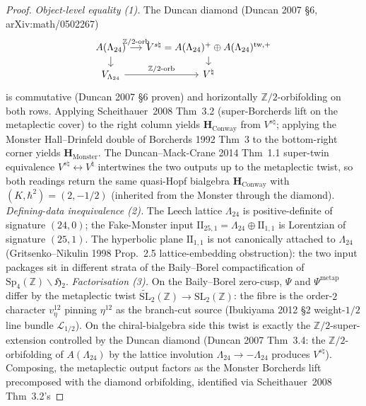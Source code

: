 \begin{proof}[Proof]
\emph{Object-level equality (1).}
The Duncan diamond (Duncan 2007 \S6, arXiv:math/0502267)
\[
 \begin{tikzcd}[column sep=small, row sep=small]
 A(\Lambda_{24}) \arrow[r, "\mathbb{Z}/2\text{-}\mathrm{orb}"]
 \arrow[d]
 & V^{s\natural} = A(\Lambda_{24})^{+}\oplus A(\Lambda_{24})^{\mathrm{tw},+}
 \arrow[d] \\
 V_{\Lambda_{24}} \arrow[r, "\mathbb{Z}/2\text{-}\mathrm{orb}"]
 & V^\natural
 \end{tikzcd}
\]
is commutative (Duncan 2007 \S6 proven) and horizontally
$\mathbb{Z}/2$-orbifolding on both rows. Applying
Scheithauer~2008 Thm~3.2 (super-Borcherds lift on the metaplectic
cover) to the right column yields
$\mathbf{H}_{\mathrm{Conway}}$ from $V^{s\natural}$;
applying the Monster Hall--Drinfeld double of Borcherds 1992 Thm~3
to the bottom-right corner yields $\mathbf{H}_{\mathrm{Monster}}$.
The Duncan--Mack-Crane 2014 Thm~1.1 super-twin equivalence
$V^{s\natural}\leftrightarrow V^\natural$ intertwines the two outputs
up to the metaplectic twist, so both readings return the same
quasi-Hopf bialgebra $\mathbf{H}_{\mathrm{Conway}}$ with
$(K,\hbar^2) = (2,-1/2)$ (inherited from the Monster through the
diamond).
\emph{Defining-data inequivalence (2).}
The Leech lattice $\Lambda_{24}$ is positive-definite of
signature $(24,0)$; the Fake-Monster input
$\mathrm{II}_{25,1} = \Lambda_{24}\oplus\mathrm{II}_{1,1}$ is
Lorentzian of signature $(25,1)$. The hyperbolic plane
$\mathrm{II}_{1,1}$ is not canonically attached to $\Lambda_{24}$
(Gritsenko--Nikulin 1998 Prop.~2.5 lattice-embedding
obstruction): the two input packages sit in different strata
of the Baily--Borel compactification of $\mathrm{Sp}_4(\mathbb{Z})\backslash\mathfrak{H}_2$.
\emph{Factorisation (3).}
On the Baily--Borel zero-cusp, $\Psi$ and $\Psi^{\mathrm{metap}}$
differ by the metaplectic twist $\widetilde{\mathrm{SL}}_2(\mathbb{Z})
\to \mathrm{SL}_2(\mathbb{Z})$: the fibre is the order-$2$
character $v_\eta^{12}$ pinning $\eta^{12}$ as the branch-cut
source (Ibukiyama 2012 \S 2 weight-$1/2$ line bundle
$\mathcal{L}_{1/2}$). On the chiral-bialgebra side this twist is
exactly the $\mathbb{Z}/2$-super-extension controlled by the
Duncan diamond (Duncan 2007 Thm~3.4: the
$\mathbb{Z}/2$-orbifolding of $A(\Lambda_{24})$ by the lattice
involution $\Lambda_{24}\to -\Lambda_{24}$ produces
$V^{s\natural}$). Composing, the metaplectic output factors as
the Monster Borcherds lift precomposed with the diamond
orbifolding, identified via Scheithauer~2008 Thm~3.2's

\end{proof}

